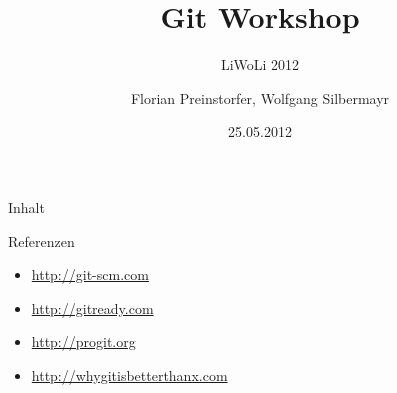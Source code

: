 \documentclass[%
]{beamer}
\title{Git Workshop}
\subtitle{LiWoLi 2012}
\author[Florian Preinstorfer, Wolfgang Silbermayr]{Florian Preinstorfer, Wolfgang Silbermayr}
\date[LiWoLi - 25.05.2012]{25.05.2012}
\begin{document}
\frame[plain]{\titlepage}

\begin{frame}{Inhalt}
  \tableofcontents
\end{frame}






\begin{frame}{Referenzen}
\begin{itemize}
  \item \url{http://git-scm.com}
  \item \url{http://gitready.com}
  \item \url{http://progit.org}
  \item \url{http://whygitisbetterthanx.com}
\end{itemize}
\end{frame}

\frame[plain]{\titlepage}
\end{document}
